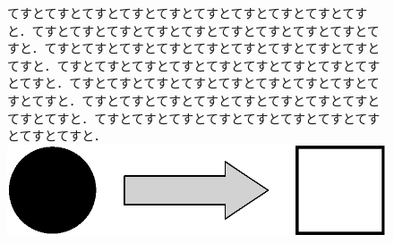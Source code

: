 \documentclass[twoside]{wiss}
\begin{document}
\begin{figure}[!b]
{\begin{minipage}[b]{0.9\textwidth}
\begin{multicols}{2}
てすとてすとてすとてすとてすとてすとてすとてすとてすとてすと．てすとてすとてすとてすとてすとてすとてすとてすとてすとてすと．てすとてすとてすとてすとてすとてすとてすとてすとてすとてすと．てすとてすとてすとてすとてすとてすとてすとてすとてすとてすと．てすとてすとてすとてすとてすとてすとてすとてすとてすとてすと．てすとてすとてすとてすとてすとてすとてすとてすとてすとてすと．てすとてすとてすとてすとてすとてすとてすとてすとてすとてすと．
\vspace*{5mm}
\includegraphics[width=0.95\columnwidth]{vision.eps}

\end{multicols}
\end{minipage}
}

\newlength{\FUTUREHT}
\setlength{\FUTUREHT}{\the\ht\FUTURE}	%
\hspace*{0.045\textwidth}	%
\box\FUTURE
\vspace*{-\the\FUTUREHT}	%
\vspace*{-10.9mm}		%

\begin{center}
\fboxrule=0pt
\end{center}
\end{figure}

\end{document}
